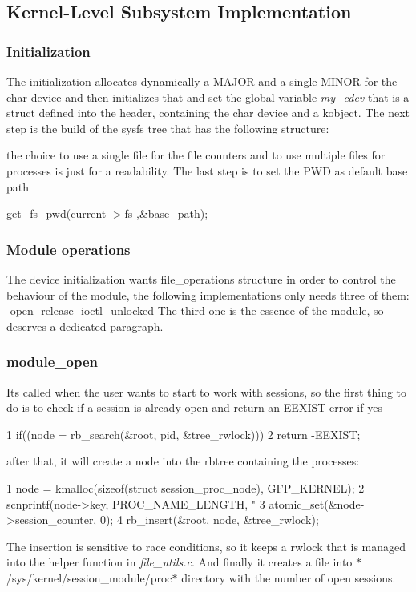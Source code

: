 \subsection*{Kernel-\/\+Level Subsystem Implementation}

\subsubsection*{Initialization}

The initialization allocates dynamically a M\+A\+J\+OR and a single M\+I\+N\+OR for the char device and then initializes that and set the global variable {\itshape my\+\_\+cdev} that is a struct defined into the header, containing the char device and a kobject. The next step is the build of the sysfs tree that has the following structure\+:



the choice to use a single file for the file counters and to use multiple files for processes is just for a readability. The last step is to set the P\+WD as default base path

{\ttfamily get\+\_\+fs\+\_\+pwd(current-\/$>$fs ,\&base\+\_\+path);}

\subsubsection*{Module operations}

The device initialization wants file\+\_\+operations structure in order to control the behaviour of the module, the following implementations only needs three of them\+: -\/open -\/release -\/ioctl\+\_\+unlocked The third one is the essence of the module, so deserves a dedicated paragraph. \subsubsection*{module\+\_\+open}

It\textquotesingle{}s called when the user wants to start to work with sessions, so the first thing to do is to check if a session is already open and return an E\+E\+X\+I\+ST error if yes 
\begin{DoxyCode}
1 if((node = rb\_search(&root, pid, &tree\_rwlock)))
2         return -EEXIST;
\end{DoxyCode}


after that, it will create a node into the rbtree containing the processes\+: 
\begin{DoxyCode}
1 node = kmalloc(sizeof(struct session\_proc\_node), GFP\_KERNEL);
2     scnprintf(node->key, PROC\_NAME\_LENGTH, "%
3     atomic\_set(&node->session\_counter, 0);
4     rb\_insert(&root, node, &tree\_rwlock);
\end{DoxyCode}
 The insertion is sensitive to race conditions, so it keeps a rwlock that is managed into the helper function in {\itshape file\+\_\+utils.\+c}. And finally it creates a file into $\ast$/sys/kernel/session\+\_\+module/proc$\ast$ directory with the number of open sessions.


